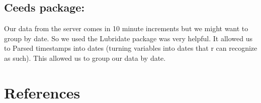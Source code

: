\documentclass[10pt,letterpaper]{article}
\begin{document}
\subsection{Ceeds package:}\label{ceeds-package}

Our data from the server comes in 10 minute increments but we might want
to group by date. So we used the Lubridate package was very helpful. It
allowed us to Parsed timestamps into dates (turning variables into dates
that r can recognize as such). This allowed us to group our data by
date.

\section*{References}\label{references}

\nolinenumbers
\end{document}
